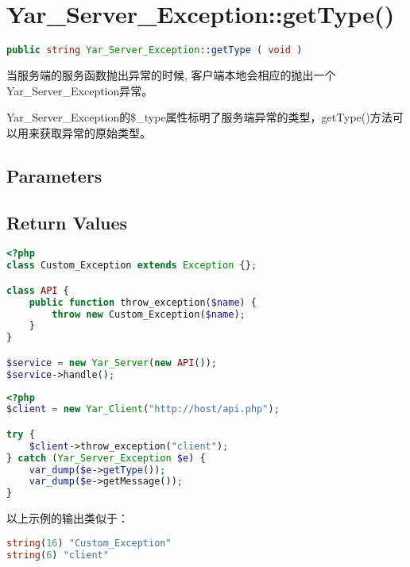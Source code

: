 \section{Yar\_Server\_Exception::getType()}




\begin{lstlisting}[language=PHP]
public string Yar_Server_Exception::getType ( void )
\end{lstlisting}

当服务端的服务函数抛出异常的时候, 客户端本地会相应的抛出一个Yar\_Server\_Exception异常。

Yar\_Server\_Exception的\$\_type属性标明了服务端异常的类型，getType()方法可以用来获取异常的原始类型。

\subsection{Parameters}


\subsection{Return Values}








\begin{lstlisting}[language=PHP]
<?php
class Custom_Exception extends Exception {};

class API {
    public function throw_exception($name) {
        throw new Custom_Exception($name);
    }
}

$service = new Yar_Server(new API());
$service->handle();
\end{lstlisting}




\begin{lstlisting}[language=PHP]
<?php
$client = new Yar_Client("http://host/api.php");

try {
    $client->throw_exception("client");
} catch (Yar_Server_Exception $e) {
    var_dump($e->getType());
    var_dump($e->getMessage());
}
\end{lstlisting}

以上示例的输出类似于：



\begin{lstlisting}[language=PHP]
string(16) "Custom_Exception"
string(6) "client"
\end{lstlisting}

